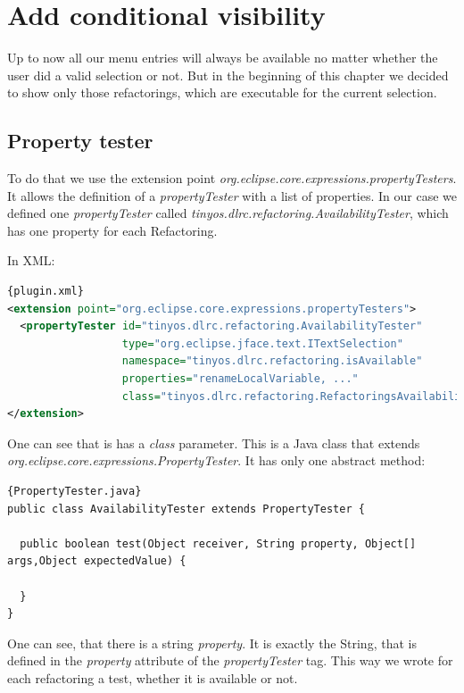 \documentclass[a4paper,10pt]{report}
\begin{document}
\section{Add conditional visibility}
\label{conditionalVisibility}
Up to now all our menu entries will always be available no matter whether the user did a valid selection or not.
But in the beginning of this chapter we decided to show only those refactorings, which are executable for the current selection.

\subsection{Property tester}
To do that we use the extension point {\it org.eclipse.core.expressions.propertyTesters}.
It allows the definition of a {\it propertyTester} with a list of properties.
In our case we defined one {\it propertyTester} called {\it tinyos.dlrc.refactoring.AvailabilityTester}, which has one property for each Refactoring.

In XML:
\begin{lstlisting}[language=XML,caption=Property tester ({\it plugin.xml})]{plugin.xml}
<extension point="org.eclipse.core.expressions.propertyTesters">
  <propertyTester id="tinyos.dlrc.refactoring.AvailabilityTester"
                  type="org.eclipse.jface.text.ITextSelection"
                  namespace="tinyos.dlrc.refactoring.isAvailable"
                  properties="renameLocalVariable, ..."
                  class="tinyos.dlrc.refactoring.RefactoringsAvailabilityTester" />
</extension>
\end{lstlisting}

One can see that is has a {\it class} parameter. This is a Java class that extends \\{\it org.eclipse.core.expressions.PropertyTester}.
It has only one abstract method:
\begin{lstlisting}[caption=extends PropertyTester]{PropertyTester.java}
public class AvailabilityTester extends PropertyTester {

  public boolean test(Object receiver, String property, Object[] args,Object expectedValue) {
    
  }
}
\end{lstlisting}
One can see, that there is a string {\it property}. 
It is exactly the String, that is defined in the {\it property} attribute of the {\it propertyTester} tag.
This way we wrote for each refactoring a test, whether it is available or not.
\end{document}
